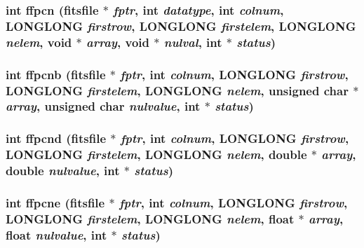 \subsubsection{\setlength{\rightskip}{0pt plus 5cm}int ffpcn (\bf{fitsfile} $\ast$ {\em fptr}, int {\em datatype}, int {\em colnum}, \bf{LONGLONG} {\em firstrow}, \bf{LONGLONG} {\em firstelem}, \bf{LONGLONG} {\em nelem}, void $\ast$ {\em array}, void $\ast$ {\em nulval}, int $\ast$ {\em status})}\label{src_2fitsio_8h_a062602b8a804f46be72152477dc2321}


\subsubsection{\setlength{\rightskip}{0pt plus 5cm}int ffpcnb (\bf{fitsfile} $\ast$ {\em fptr}, int {\em colnum}, \bf{LONGLONG} {\em firstrow}, \bf{LONGLONG} {\em firstelem}, \bf{LONGLONG} {\em nelem}, unsigned char $\ast$ {\em array}, unsigned char {\em nulvalue}, int $\ast$ {\em status})}\label{src_2fitsio_8h_52e1f7ec25307939c85af2e5ab92fe5f}


\subsubsection{\setlength{\rightskip}{0pt plus 5cm}int ffpcnd (\bf{fitsfile} $\ast$ {\em fptr}, int {\em colnum}, \bf{LONGLONG} {\em firstrow}, \bf{LONGLONG} {\em firstelem}, \bf{LONGLONG} {\em nelem}, double $\ast$ {\em array}, double {\em nulvalue}, int $\ast$ {\em status})}\label{src_2fitsio_8h_521f9cb2a81ba66277d032513255e1f6}


\subsubsection{\setlength{\rightskip}{0pt plus 5cm}int ffpcne (\bf{fitsfile} $\ast$ {\em fptr}, int {\em colnum}, \bf{LONGLONG} {\em firstrow}, \bf{LONGLONG} {\em firstelem}, \bf{LONGLONG} {\em nelem}, float $\ast$ {\em array}, float {\em nulvalue}, int $\ast$ {\em status})}\label{src_2fitsio_8h_e90f56227753bb7883ba1b42e31a5f00}


